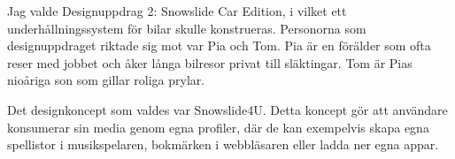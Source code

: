 Jag valde Designuppdrag 2: Snowslide Car Edition, i vilket ett
underhållningssystem för bilar skulle konstrueras. Personorna som
designuppdraget riktade sig mot var Pia och Tom. Pia är en förälder 
som ofta reser med jobbet och åker långa bilresor privat till släktingar. Tom
är Pias nioåriga son som gillar roliga prylar.

Det designkoncept som valdes var Snowslide4U. Detta koncept gör att användare
konsumerar sin media genom egna profiler, där de kan exempelvis skapa egna
spellistor i musikspelaren, bokmärken i webbläsaren eller ladda ner egna appar.
